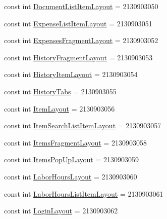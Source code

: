 \begin{DoxyCompactItemize}
\item 
const int \hyperlink{class_field_service_1_1_android_1_1_resource_1_1_layout_a8bbaf9ddc36b108a2dc12a39463cb369}{Document\+List\+Item\+Layout} = 2130903050
\item 
const int \hyperlink{class_field_service_1_1_android_1_1_resource_1_1_layout_ad876cdc11db0e8daa6ed04cc1bcf301f}{Expense\+List\+Item\+Layout} = 2130903051
\item 
const int \hyperlink{class_field_service_1_1_android_1_1_resource_1_1_layout_a9367732583e77b34cbfa0260ae05ef59}{Expenses\+Fragment\+Layout} = 2130903052
\item 
const int \hyperlink{class_field_service_1_1_android_1_1_resource_1_1_layout_a87d4bbd52c8b739661bc809d984cd94d}{History\+Fragment\+Layout} = 2130903053
\item 
const int \hyperlink{class_field_service_1_1_android_1_1_resource_1_1_layout_ae52b22815ba21cbbc867c2d3766ac45f}{History\+Item\+Layout} = 2130903054
\item 
const int \hyperlink{class_field_service_1_1_android_1_1_resource_1_1_layout_ae7f0a7e46827734f17a2bfec57f965fd}{History\+Tabs} = 2130903055
\item 
const int \hyperlink{class_field_service_1_1_android_1_1_resource_1_1_layout_ae6472a8242d6dbb9ee5c22c1b0bafa1b}{Item\+Layout} = 2130903056
\item 
const int \hyperlink{class_field_service_1_1_android_1_1_resource_1_1_layout_a59dcfa1e0bdcd1bdba5f958f7e3d2c91}{Item\+Search\+List\+Item\+Layout} = 2130903057
\item 
const int \hyperlink{class_field_service_1_1_android_1_1_resource_1_1_layout_a115eb089f293590ae36b4577e7826ba9}{Items\+Fragment\+Layout} = 2130903058
\item 
const int \hyperlink{class_field_service_1_1_android_1_1_resource_1_1_layout_a2df5a1a77eddde7de92eab15abe90d9c}{Items\+Pop\+Up\+Layout} = 2130903059
\item 
const int \hyperlink{class_field_service_1_1_android_1_1_resource_1_1_layout_a6412a95407713f468195cbdc6b298dd4}{Labor\+Hours\+Layout} = 2130903060
\item 
const int \hyperlink{class_field_service_1_1_android_1_1_resource_1_1_layout_a8b3aa65341edae0d892b1f6a8f7d0832}{Labor\+Hours\+List\+Item\+Layout} = 2130903061
\item 
const int \hyperlink{class_field_service_1_1_android_1_1_resource_1_1_layout_a94b1b8b92cf828b7be9d163108c2d730}{Login\+Layout} = 2130903062
\item 

\end{DoxyCompactItemize}
